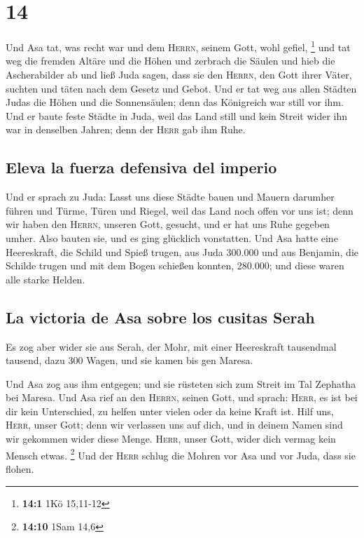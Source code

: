 \hypertarget{section-13}{%
\section{14}\label{section-13}}

 Und Asa tat, was recht war und dem \textsc{Herrn}, seinem
Gott, wohl gefiel, \footnote{\textbf{14:1} 1Kö 15,11-12} 
und tat weg die fremden Altäre und die Höhen und zerbrach die Säulen und
hieb die Ascherabilder ab  und ließ Juda sagen, dass sie
den \textsc{Herrn}, den Gott ihrer Väter, suchten und täten nach dem
Gesetz und Gebot.  Und er tat weg aus allen Städten Judas
die Höhen und die Sonnensäulen; denn das Königreich war still vor ihm.
 Und er baute feste Städte in Juda, weil das Land still
und kein Streit wider ihn war in denselben Jahren; denn der
\textsc{Herr} gab ihm Ruhe.

\hypertarget{eleva-la-fuerza-defensiva-del-imperio}{%
\subsection{Eleva la fuerza defensiva del
imperio}\label{eleva-la-fuerza-defensiva-del-imperio}}

 Und er sprach zu Juda: Lasst uns diese Städte bauen und
Mauern darumher führen und Türme, Türen und Riegel, weil das Land noch
offen vor uns ist; denn wir haben den \textsc{Herrn}, unseren Gott,
gesucht, und er hat uns Ruhe gegeben umher. Also bauten sie, und es ging
glücklich vonstatten.  Und Asa hatte eine Heereskraft, die
Schild und Spieß trugen, aus Juda 300.000 und aus Benjamin, die Schilde
trugen und mit dem Bogen schießen konnten, 280.000; und diese waren alle
starke Helden.

\hypertarget{la-victoria-de-asa-sobre-los-cusitas-serah}{%
\subsection{La victoria de Asa sobre los cusitas
Serah}\label{la-victoria-de-asa-sobre-los-cusitas-serah}}

 Es zog aber wider sie aus Serah, der Mohr, mit einer
Heereskraft tausendmal tausend, dazu 300 Wagen, und sie kamen bis gen
Maresa.

 Und Asa zog aus ihm entgegen; und sie rüsteten sich zum
Streit im Tal Zephatha bei Maresa.  Und Asa rief an den
\textsc{Herrn}, seinen Gott, und sprach: \textsc{Herr}, es ist bei dir
kein Unterschied, zu helfen unter vielen oder da keine Kraft ist. Hilf
uns, \textsc{Herr}, unser Gott; denn wir verlassen uns auf dich, und in
deinem Namen sind wir gekommen wider diese Menge. \textsc{Herr}, unser
Gott, wider dich vermag kein Mensch etwas. \footnote{\textbf{14:10} 1Sam
  14,6}  Und der \textsc{Herr} schlug die Mohren vor Asa
und vor Juda, dass sie flohen.

